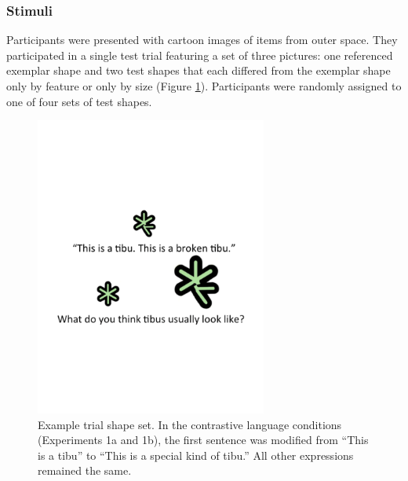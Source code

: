 \documentclass[10pt,letterpaper]{article}
\begin{document}
\subsubsection{Stimuli}

Participants were presented with cartoon images of items from outer space. They participated in a single test trial featuring a set of three pictures: one referenced exemplar shape and two test shapes that each differed from the exemplar shape only by feature or only by size (Figure \ref{fig:demo}).  Participants were randomly assigned to one of four sets of test shapes.  


\begin{figure}[t] 
  \begin{center} 
    \includegraphics[width=3in]{figures/demo.pdf} 
    \caption{\label{fig:demo} Example trial shape set.  In the contrastive language conditions (Experiments 1a and 1b), the first sentence was modified from ``This is a tibu'' to ``This is a special kind of tibu.''  All other expressions remained the same. }
  \end{center} 
\end{figure}
	
\end{document}
